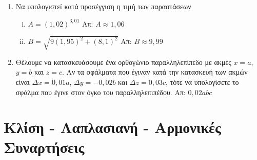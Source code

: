 \begin{enumerate}
  \item Να υπολογιστεί κατά προσέγγιση η τιμή των παραστάσεων
    \begin{enumerate}[i)]
      \item $A = (1,02)^{3,01} $ \hfill Απ: $ A \approx 1,06 $ 
      \item $B =  \sqrt{ 9(1,95)^{2} + (8,1)^{2} } $ 
        \hfill Απ: $ B \approx 9,99 $ 
    \end{enumerate}

  \item Θέλουμε να κατασκευάσουμε ένα ορθογώνιο παραλληλεπίπεδο με ακμές $ x = a $, 
    $ y=b $ και $ z=c $. Αν τα σφάλματα που έγιναν κατά την κατασκευή των ακμών 
    είναι $ \Delta x = 0,01a $, $ \Delta y = -0,02b $ και $ \Delta z = 0,03c $, 
    τότε να υπολογίσετε το σφάλμα που έγινε στον όγκο του παραλληλεπιπέδου.
    \hfill Απ: $ 0,02abc $ 
\end{enumerate}


\section*{Κλίση - Λαπλασιανή - Αρμονικές Συναρτήσεις}

